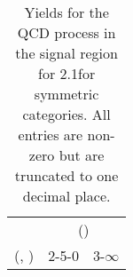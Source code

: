 \begin{table}[h!]
\tiny
\centering
\caption{Yields for the QCD process in the signal region for 2.1\ifb for symmetric categories. All entries are non-zero but are truncated to one decimal place.\label{tab:yieldssep_sig_qcd_sym}}
\begin{tabular}
{ccc}
	\hline\hline
	& \multicolumn{2}{c}{\scalht (\gev)} \\ 
	 (\njet,  \nb) & 2-5-0 & 3-$\infty$ \\ [0.8ex] 
\hline
	\hline
	\hline
\end{tabular}
\end{table}
